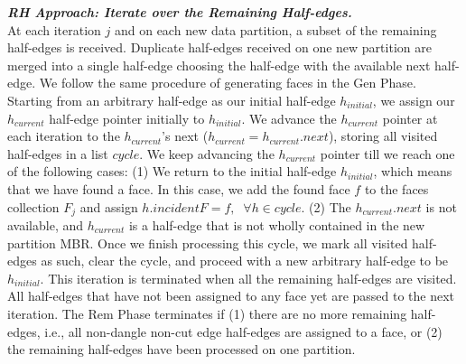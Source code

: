 \vspace{4pt}
\textit{\textbf{RH Approach: Iterate over the Remaining Half-edges.}}
\\
At each iteration $j$ and on each new data partition, a subset of the remaining half-edges is received. 
Duplicate half-edges received on one new partition are merged into a single half-edge choosing the half-edge with the available next half-edge.
We follow the same procedure of generating faces in the Gen Phase. Starting from an arbitrary half-edge as our initial half-edge $h_{initial}$, we assign our $h_{current}$ half-edge pointer initially to $h_{initial}$. We advance the $h_{current}$ pointer at each iteration to the $h_{current}$'s next ($h_{current} = h_{current}.next$), storing all visited half-edges in a list $cycle$. We keep advancing the $h_{current}$ pointer till we reach one of the following cases:
(1) We return to the initial half-edge $h_{initial}$, which means that we have found a face. In this case, we add the found face $f$ to the faces collection $F_j$ and assign $h.incidentF = f, \;\; \forall h \in cycle$.
(2) The $h_{current}.next$ is not available, and $h_{current}$ is a half-edge that is not wholly contained in the new partition MBR.
Once we finish processing this cycle, we mark all visited half-edges as such, clear the cycle, and proceed with a new arbitrary half-edge to be $h_{initial}$.
This iteration is terminated when all the remaining half-edges are visited. All half-edges that have not been assigned to any face yet are passed to the next iteration.
The Rem Phase terminates if (1) there are no more remaining half-edges, i.e., all non-dangle non-cut edge half-edges are assigned to a face, or (2) the remaining half-edges have been processed on one partition.


